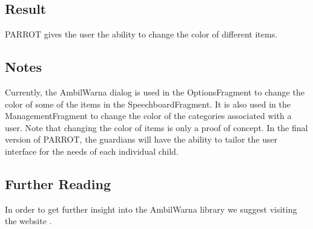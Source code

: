 \subsection*{Result}
PARROT gives the user the ability to change the color of different items.\newline

\subsection*{Notes}
Currently, the AmbilWarna dialog is used in the OptionsFragment %
to change the color of some of the items in the SpeechboardFragment. It is also used in the ManagementFragment to change the color of the categories associated with a user.\newline
Note that changing the color of items is only a proof of concept. In the final version of PARROT, the guardians will have the ability to tailor the user interface for the needs of each individual child.

\subsection*{Further Reading}
In order to get further insight into the AmbilWarna library we suggest visiting the website \cite{ambilw}.